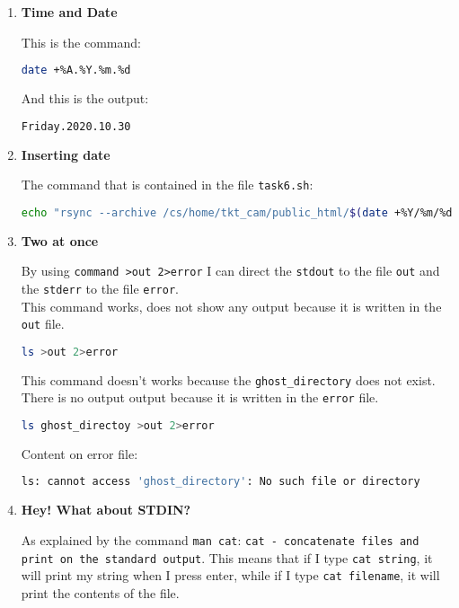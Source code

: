 \documentclass[9pt]{article}
\begin{document}
\begin{enumerate}
\begin{lstlisting}[language=bash,breaklines=true]
Number of files: 25 (reg: 24, dir: 1)
Number of created files: 1 (reg: 1)
Number of deleted files: 0
Number of regular files transferred: 1
Total file size: 9,712,499 bytes
Total transferred file size: 369,426 bytes
Literal data: 369,426 bytes
Matched data: 0 bytes
File list size: 0
File list generation time: 0.005 seconds
File list transfer time: 0.000 seconds
Total bytes sent: 370,108
Total bytes received: 107

sent 370,108 bytes  received 107 bytes  740,430.00 bytes/sec
total size is 9,712,499  speedup is 26.23
		\end{lstlisting}

	\item \textbf{Time and Date}
	
		This is the command:
		\begin{lstlisting}[language=bash]
date +%A.%Y.%m.%d 
		\end{lstlisting}
		And this is the output:
		\begin{lstlisting}[language=bash]
Friday.2020.10.30
		\end{lstlisting}
		
	\item \textbf{Inserting date}
	
		The command that is contained in the file \texttt{task6.sh}:
		\begin{lstlisting}[language=bash,breaklines=true]
echo "rsync --archive /cs/home/tkt_cam/public_html/$(date +%Y/%m/%d)/~/ShellScripting2019/Week1/$(date +%A.%Y.%m.%d)"
		\end{lstlisting}
		
	\item \textbf{Two at once}
	
		By using \texttt{command >out 2>error} I can direct the \texttt{stdout} to the file \texttt{out} and the \texttt{stderr} to the file \texttt{error}.\\
		This command works, does not show any output because it is written in the \texttt{out} file.
		\begin{lstlisting}[language=bash]
ls >out 2>error
		\end{lstlisting}
		This command doesn't works because the \texttt{ghost\_directory} does not exist.
		There is no output output because it is written in the \texttt{error} file.
		\begin{lstlisting}[language=bash]
ls ghost_directoy >out 2>error
		\end{lstlisting}
		Content on error file:
		\begin{lstlisting}[language=bash]
ls: cannot access 'ghost_directory': No such file or directory
		\end{lstlisting}
		
	\item \textbf{Hey! What about STDIN?}
	
		As explained by the command \texttt{man cat}: \texttt{cat - concatenate files and print on the standard output}.
		This means that if I type \texttt{cat string}, it will print my string when I press enter, while if I type \texttt{cat filename}, it will print the contents of the file.
	
\end{enumerate}
\end{document}

